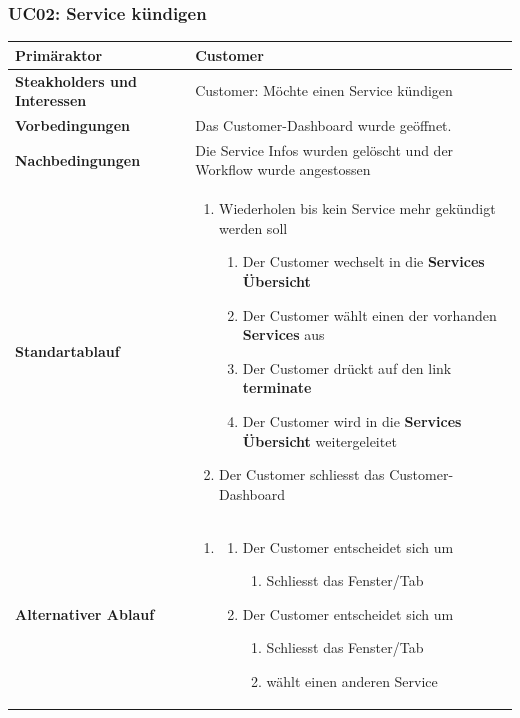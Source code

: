 \documentclass[11pt]{scrartcl}
\begin{document}
\subsubsection{UC02: Service kündigen}
\begin{longtabu} to \textwidth {X[1,l] X[2,l]}
	\bfseries Primäraktor & Customer  \\\hline 
	\bfseries Steakholders und Interessen & Customer: Möchte einen Service kündigen  \\\hline 
	\bfseries Vorbedingungen & Das Customer-Dashboard wurde geöffnet.  \\\hline 
	\bfseries Nachbedingungen & Die Service Infos wurden gelöscht und der Workflow wurde angestossen   \\\hline 
	\bfseries Standartablauf & 
		\begin{enumerate}
			\item Wiederholen bis kein Service mehr gekündigt werden soll
			\begin{enumerate}
			    \item Der Customer wechselt in die \textbf{Services Übersicht}
			    \item Der Customer wählt einen der vorhanden \textbf{Services} aus
			    \item Der Customer drückt auf den link \textbf{terminate}
			    \item Der Customer wird in die \textbf{Services Übersicht} weitergeleitet
			\end{enumerate}
		\item Der Customer schliesst das Customer-Dashboard
		\end{enumerate}
      \\\hline
      	\bfseries Alternativer Ablauf & 
		\begin{enumerate}
		  
		  \item 
                 \begin{enumerate}
		    \item Der Customer entscheidet sich um
		    \begin{enumerate}
		      \item Schliesst das Fenster/Tab
		    \end{enumerate}
		    \item  Der Customer entscheidet sich um
		     \begin{enumerate}
		      \item Schliesst das Fenster/Tab
		      \item wählt einen anderen Service
		    \end{enumerate}
		    

\end{enumerate}
\end{enumerate}
\end{longtabu}
\end{document}
